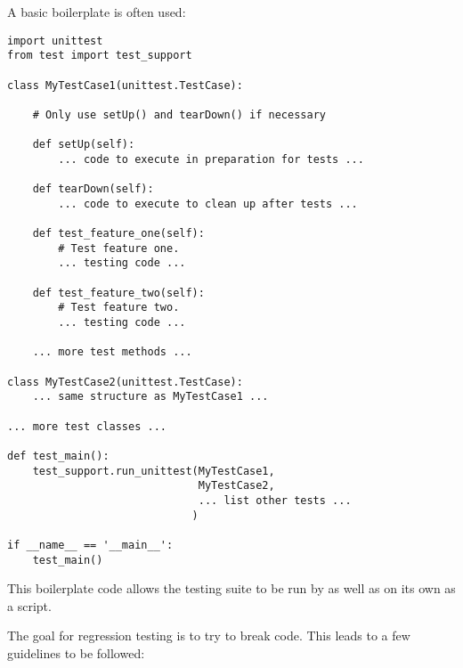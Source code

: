 A basic boilerplate is often used:

\begin{verbatim}
import unittest
from test import test_support

class MyTestCase1(unittest.TestCase):

    # Only use setUp() and tearDown() if necessary

    def setUp(self):
        ... code to execute in preparation for tests ...

    def tearDown(self):
        ... code to execute to clean up after tests ...

    def test_feature_one(self):
        # Test feature one.
        ... testing code ...

    def test_feature_two(self):
        # Test feature two.
        ... testing code ...

    ... more test methods ...

class MyTestCase2(unittest.TestCase):
    ... same structure as MyTestCase1 ...

... more test classes ...

def test_main():
    test_support.run_unittest(MyTestCase1,
                              MyTestCase2,
                              ... list other tests ...
                             )

if __name__ == '__main__':
    test_main()
\end{verbatim}

This boilerplate code allows the testing suite to be run by
 as well as on its own as a script.

The goal for regression testing is to try to break code.
This leads to a few guidelines to be followed:

